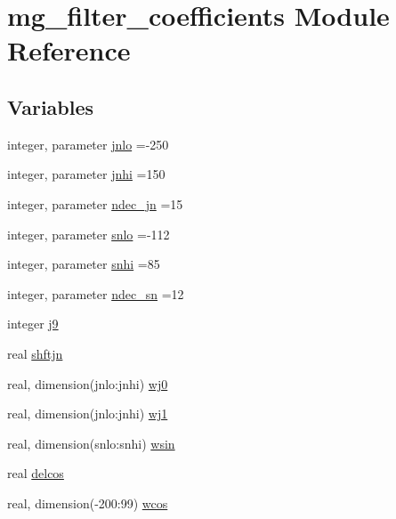 \hypertarget{namespacemg__filter__coefficients}{}\section{mg\+\_\+filter\+\_\+coefficients Module Reference}
\label{namespacemg__filter__coefficients}
\subsection*{Variables}
\begin{DoxyCompactItemize}
\item 
integer, parameter \hyperlink{namespacemg__filter__coefficients_a610240075eb5a7a6edf1336aceaa8a12}{jnlo} =-\/250
\item 
integer, parameter \hyperlink{namespacemg__filter__coefficients_ae99157ef3b8edaa295b1a8230f9b118c}{jnhi} =150
\item 
integer, parameter \hyperlink{namespacemg__filter__coefficients_ad58cefb64aa38c7129c2bcd9bacf4a90}{ndec\+\_\+jn} =15
\item 
integer, parameter \hyperlink{namespacemg__filter__coefficients_a1600fb58e8eb22d762634b8fdf79e1e3}{snlo} =-\/112
\item 
integer, parameter \hyperlink{namespacemg__filter__coefficients_a87a2b5c09b18d463bdad44275dda292a}{snhi} =85
\item 
integer, parameter \hyperlink{namespacemg__filter__coefficients_aa6265b0922421eec8712cb53247cbd03}{ndec\+\_\+sn} =12
\item 
integer \hyperlink{namespacemg__filter__coefficients_adbf6624b4de7760282e3a9be6a59938a}{j9}
\item 
real \hyperlink{namespacemg__filter__coefficients_afdd6d43570da7c2de03a1bf3f6cb2871}{shftjn}
\item 
real, dimension(jnlo\+:jnhi) \hyperlink{namespacemg__filter__coefficients_afb7b9b7a8195490bfa6a293abd5493b3}{wj0}
\item 
real, dimension(jnlo\+:jnhi) \hyperlink{namespacemg__filter__coefficients_ae70ba1c8ff8f09c80e97f66ce47ba300}{wj1}
\item 
real, dimension(snlo\+:snhi) \hyperlink{namespacemg__filter__coefficients_ae1e06a63bc231676d15e2ddc1871f2c8}{wsin}
\item 
real \hyperlink{namespacemg__filter__coefficients_a50fb8fcb38f753db2bf4a2d8dae9882c}{delcos}
\item 
real, dimension(-\/200\+:99) \hyperlink{namespacemg__filter__coefficients_a650f935ee4aed00905ba989f7d6a0565}{wcos}
\end{DoxyCompactItemize}


